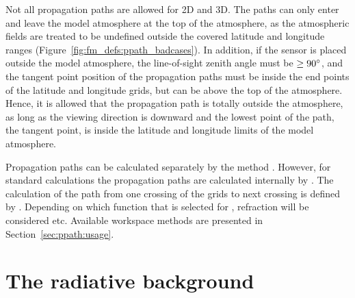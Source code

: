 Not all propagation paths are allowed for 2D and 3D. The paths can
only enter and leave the model atmosphere at the top of the
atmosphere, as the atmospheric fields are treated to be undefined
outside the covered latitude and longitude ranges
(Figure~\ref{fig:fm_defs:ppath_badcases}). In addition, if the sensor
is placed outside the model atmosphere, the line-of-sight zenith angle
must be $\geq90^\circ$, and the tangent point position of the
propagation paths must be inside the end points of the latitude and
longitude grids, but can be above the top of the atmosphere. Hence, it
is allowed that the propagation path is totally outside the
atmosphere, as long as the viewing direction is downward and the
lowest point of the path, the tangent point, is inside the latitude
and longitude limits of the model atmosphere.

Propagation paths can be calculated separately by the method
. However, for standard calculations the propagation paths
are calculated internally by . The calculation of the path
from one crossing of the grids to next crossing is defined by
. Depending on which function that is selected
for , refraction will be considered etc.
Available workspace methods are presented in Section~\ref{sec:ppath:usage}.




\section{The radiative background}
\label{sec:fm_defs:rad_bkgr}

